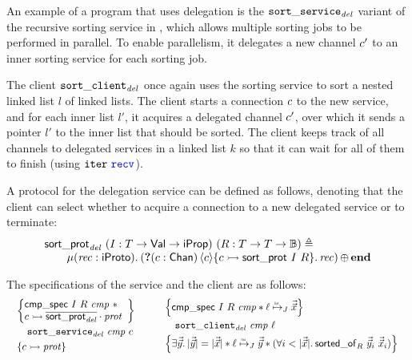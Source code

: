 An example of a program that uses delegation is the $\mathtt{sort\_service}_{\mathit{del}}$ variant
of the recursive sorting service in , which allows
multiple sorting jobs to be performed in parallel.
To enable parallelism, it delegates a new channel $c'$ to an inner sorting
service for each sorting job.

The client $\mathtt{sort\_client}_{\mathit{del}}$ once again uses the sorting service to sort a
nested linked list $l$ of linked lists.
The client starts a connection $c$ to the new service, and for each inner
list $l'$, it acquires a delegated channel $c'$, over which it sends a
pointer $l'$ to the inner list that should be sorted.
The client keeps track of all channels to delegated services in a linked
list $k$ so that it can wait for all of them to finish (using
$\mathtt{iter}\ \texttt{\color{blue} recv}$).

A protocol for the delegation service can be defined as follows,
denoting that the client can select whether to acquire a
connection to a new delegated service or to terminate:
\begin{equation*}
\begin{array}{l}
\listsortdelprotname\ (\interpvar : \tvar \to \Val \to \Prop)
  \ (\relvar : \tvar \to \tvar \to \bool) \eqdef{} \\
\qquad \MU (\recvar : \iProto).
  \selectprot
    {(\recvprot {(\chan:\Chan)} \chan {\interp \chan
       {\listsortprotname\ \interpvar\ \relvar}} \recvar)}
    \protend
\end{array}
\end{equation*}

\noindent
The specifications of the service and the client are as follows:
\[
\begin{array}{c !{\quad} c}
\begin{array}{l}
\hoareV
  {\begin{array}{@{} l}
   \cmpspecname\ \interpvar\ \relvar\ \cmpvar\ *\\
   \interp \chan {\protapp {\dual\listsortdelprotname} \prot}
   \end{array}}
  {\listsortdelservicename\ \cmpvar\ \chan}
  {\interp\chan \prot}
\end{array}
&
\begin{array}{l}
\hoareV
  {\cmpspecname\ \interpvar\ \relvar\ \cmpvar *
   \listrefI \interpvarB \loc {\vec{\vec\var}}}
  {\listsortdelclientname\ \cmpvar\ \loc}
  {
    \Exists \vec{\vec\varB}.
    \listlength {\vec{\vec\varB}} = \listlength {\vec{\vec\var}} *
    \listrefI \interpvarB \loc {\vec{\vec\varB}} *
    (\All i < \listlength {\vec{\vec\var}}.
      \sortedof{\vec{\vec\varB}_i} {\vec{\vec\var}_i} \relvar)}
\end{array}
\end{array}
\]

